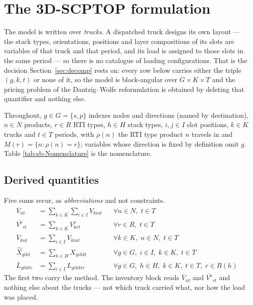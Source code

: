 \section{The 3D-SCPTOP formulation}
\label{sec:model}

The model is written over \emph{trucks}. A dispatched truck designs its
own layout --- the stack types, orientations, positions and layer
compositions of its slots are variables of that truck and that period,
and its load is assigned to those slots in the same period --- so there
is no catalogue of loading configurations. That is the decision
Section~\ref{sec:decomp} rests on: every row below carries either the
triple $(g,k,t)$ or none of it, so the model is block-angular over
$G\times K\times T$ and the pricing problem of the Dantzig--Wolfe
reformulation is obtained by deleting that quantifier and nothing
else.

Throughout, $g\in G=\{s,p\}$ indexes nodes and directions (named by
destination), $n\in N$ products, $r\in R$ RTI types, $h\in H$ stack
types, $i,j\in I$ slot positions, $k\in K$ trucks and $t\in T$ periods,
with $\rho(n)$ the RTI type product $n$ travels in and
$M(r)=\{n:\rho(n)=r\}$; variables whose direction is fixed by
definition omit $g$. Table \ref{tab:sb-Nomenclature} is the
nomenclature.



\subsection{Derived quantities}

Five sums recur, as \emph{abbreviations} and not constraints.
\begin{align}
\overline{V}_{nt}&=\sum_{k\in K}\sum_{i\in I} V_{kint}
    &&\forall n\in N,\; t\in T
    \label{sb:eq:agg-V}\\
\overline{V^{\mathrm{e}}}_{rt}&=\sum_{k\in K} V^{\mathrm{e}}_{krt}
    &&\forall r\in R,\; t\in T
    \label{sb:eq:agg-Ve}\\
\overline{V}_{knt}&=\sum_{i\in I} V_{kint}
    &&\forall k\in K,\; n\in N,\; t\in T
    \label{sb:eq:agg-Vk}\\
\widehat{X}_{gikt}&=\sum_{h\in H} X_{gihkt}
    &&\forall g\in G,\; i\in I,\; k\in K,\; t\in T
    \label{sb:eq:agg-X}\\
\overline{L}_{ghktr}&=\sum_{i\in I} L_{gihktr}
    &&\forall g\in G,\; h\in H,\; k\in K,\; t\in T,\; r\in R(h)
    \label{sb:eq:agg-L}
\end{align}
The first two carry the method. The inventory block reads
$\overline{V}_{nt}$ and $\overline{V^{\mathrm{e}}}_{rt}$ and nothing
else about the trucks --- not which truck carried what, nor how the
load was placed.


